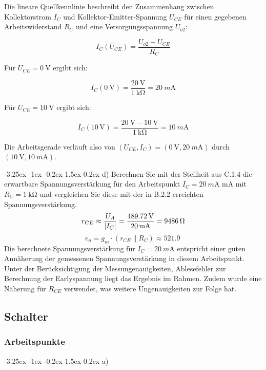 \documentclass[
	a4paper, %
	12pt, %
]{CSUniSchoolLabReport}
\makeatletter
\renewcommand\paragraph{\@startsection{paragraph}{4}{\z@}%
  {-3.25ex \@plus -1ex \@minus -0.2ex}%
  {1.5ex \@plus 0.2ex}%
  {\normalfont\normalsize\bfseries}}
\newcommand{\milli}{m}
\makeatother
\begin{document}
Die lineare Quellkennlinie beschreibt den Zusammenhang zwischen Kollektorstrom $I_C$ und Kollektor-Emitter-Spannung $U_{CE}$ für einen gegebenen Arbeitswiderstand $R_C$ und eine Versorgungsspannung $U_{o2}$:

\[
I_C(U_{CE}) = \frac{U_{o2} - U_{CE}}{R_C}
\]

Für $U_{CE} = \SI{0}{\volt}$ ergibt sich:

\[
I_C(\SI{0}{\volt}) = \frac{\SI{20}{\volt}}{\SI{1}{\kilo\ohm}} = \SI{20}{\milli\ampere}
\]

Für $U_{CE} = \SI{10}{\volt}$ ergibt sich:

\[
I_C(10\,\mathrm{V}) = \frac{\SI{20}{\volt}- \SI{10}{\volt}}{\SI{1}{\kilo\ohm}} = \SI{10}{\milli\ampere}
\]

Die Arbeitsgerade verläuft also von $(U_{CE}, I_C) = (\SI{0}{\volt}, \SI{20}{\milli\ampere})$ durch $(\SI{10}{\volt}, \SI{10}{\milli\ampere})$.



\paragraph{d) Berechnen Sie mit der Steilheit aus C.1.4 die erwartbare Spannungsverstärkung für den Arbeitspunkt
$I_C = \SI{20}{\milli\ampere}$ mA mit $R_C = \SI{1}{\kilo\ohm}$ und vergleichen Sie diese mit der in B.2.2 erreichten Spannungsverstärkung.}
\[
r_{CE} \approx \frac{U_A}{|I_C|} = \frac{\SI{189.72}{\volt}}{\SI{20}{\milli\ampere}} = \SI{9486}{\ohm} \\ 
\]
\[
v_u = g_m \cdot (r_{CE} \parallel R_C) \approx \SI{521.9}{}
\]
Die berechnete Spannungsverstärkung für $I_C = \SI{20}{\milli\ampere}$ entspricht einer guten Annäherung der gemessenen Spannungsverstärkung in diesem Arbeitspunkt. Unter der Berücksichtigung der Messungenauigkeiten, Ablesefehler zur Berechnung der Earlyspannung liegt das Ergebnis im Rahmen. Zudem wurde eine Näherung für $R_{CE}$ verwendet, was weitere Ungenauigkeiten zur Folge hat. 
\subsection{Schalter}
\subsubsection{Arbeitspunkte}

\paragraph{a)}
\end{document}
